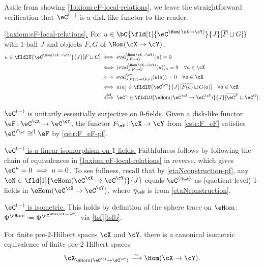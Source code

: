 \documentclass[12pt,reqno]{amsart}
\newcommand{\eFun}{{\eH}\mathrm{om}}
\newcommand{\eval}{\mathrm{eval}}
\newcommand{\psn}{\Phi}
\newcommand{\C}{\eC}
\newcommand{\fcj}[1]{\overline{#1}}
\newcommand{\itemstep}[1]{\smallskip\noindent\underline{#1}}
\renewcommand{\amalg}{\sqcup}
\renewcommand{\star}{\dag}
\DeclareRobustCommand{\coloneq}{\mathrel{\vcenter{\baselineskip0.5ex\lineskiplimit0pt\hbox{\scriptsize{\upshape.}}\hbox{\scriptsize{\upshape.}}}}=}
\begin{document}
\begin{pf}
Aside from showing \ref{1axiom:eF-local-relations}, we leave the straightforward verification that $\C^{(-)}$ is a disk-like functor to the reader.

\itemstep{\ref{1axiom:eF-local-relations}.}
For $u\in\bC\{\fld[1]{\eC^{\Hom(\cX\to\cY)}}{J}[\fcj F\amalg G]\}$ with $1$-ball $J$ and objects $F,G$ of $\Hom(\cX\to\cY)$,
\begin{align*}
  u\in\fldlU{\eC^{\Hom(\cX\to\cY)}}{J}[\fcj F\sqcup G]
  &\iff\eval^{\Hom(\cX\to\cY)}_{J,F\to G}(u)=0 \\
  &\iff(\eval^{\Hom(\cX\to\cY)}_{J,F\to G}(u))_a=0\quad\forall a\in\cX \\
  &\iff\eval^\cY_{J,F(a)\to G(a)}(u(a))=0\quad\forall a\in\cX \\
  &\iff u(a)\in\fldlU{\eC^\cY}{J}[\fcj{F(a)}\amalg G(a)]\quad\forall a\in\cX \\
  &\overset{\mathrm{def}}{\iff}\eC^u\in\fldlU{\eFun(\eC^\cX\to\eC^\cY)}{J}[\overline{\eC^F}\sqcup\eC^G].
\end{align*}

\itemstep{$\eC^{(-)}$ is unitarily essentially surjective on $0$-fields.}
Given a disk-like functor $\eF\colon\eC^\cX\to\eC^\cY$, the functor $F_\eF\colon\cX\to\cY$ from \cref{cstr:F_eF} satisfies $\eC^{F_\eF}\cong^\star \eF$ by \cref{cstr:F_eF-pf}.

\itemstep{$\eC^{(-)}$ is a linear isomorphism on $1$-fields.}
Faithfulness follows by following the chain of equivalences in \ref{1axiom:eF-local-relations} in reverse, which gives $\eC^u=0\implies u=0$. To see fullness, recall that by \cref{etaNconstruction-pf}, any $\eN\in\fld[1]{\eFun(\eC^\cX\to\eC^\cY)}{J}$ equals $\eC^{\langle\eta_{\eN}\rangle}$ as (quotient-level) 1-fields in $\eFun(\eC^\cX\to\eC^\cY)$, where $\eta_{\eN}$ is from \cref{etaNconstruction}.

\itemstep{$\eC^{(-)}$ is isometric.}
This holds by definition of the sphere trace on $\eFun$: $\psn^{\eFun}\coloneq\psn^{\eC^{\Hom(\cX\to\cY)}}$ via \cref{tsf}\ref{tsfb}. 
\end{pf}

\begin{corollary}
\label{dag-thing-i-equiv}
\label{prop:XFun}
For finite pre-2-Hilbert spaces $\cX$ and $\cY$, there is a canonical isometric equivalence of finite pre-2-Hilbert spaces
\[
    \cX_{\eFun(\eC^\cX\to\eC^\cY)} \overset\sim\longrightarrow \Hom(\cX\to\cY).
\]
\end{corollary}
\end{document}
